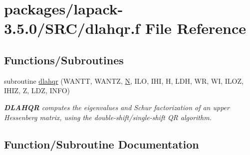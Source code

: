 \hypertarget{lapack-3_85_80_2SRC_2dlahqr_8f}{}\section{packages/lapack-\/3.5.0/\+S\+R\+C/dlahqr.f File Reference}
\label{lapack-3_85_80_2SRC_2dlahqr_8f}
\subsection*{Functions/\+Subroutines}
\begin{DoxyCompactItemize}
\item 
subroutine \hyperlink{lapack-3_85_80_2SRC_2dlahqr_8f_aa677995264e5de3914a3817a66e753c5}{dlahqr} (W\+A\+N\+T\+T, W\+A\+N\+T\+Z, \hyperlink{polmisc_8c_a0240ac851181b84ac374872dc5434ee4}{N}, I\+L\+O, I\+H\+I, H, L\+D\+H, W\+R, W\+I, I\+L\+O\+Z, I\+H\+I\+Z, Z, L\+D\+Z, I\+N\+F\+O)
\begin{DoxyCompactList}\small\item\em {\bfseries D\+L\+A\+H\+Q\+R} computes the eigenvalues and Schur factorization of an upper Hessenberg matrix, using the double-\/shift/single-\/shift Q\+R algorithm. \end{DoxyCompactList}\end{DoxyCompactItemize}


\subsection{Function/\+Subroutine Documentation}
\hypertarget{lapack-3_85_80_2SRC_2dlahqr_8f_aa677995264e5de3914a3817a66e753c5}{}
